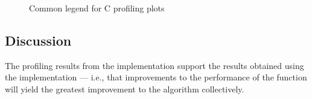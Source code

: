 \begin{figure}
    \centering
    
    \caption{Common legend for C profiling plots}
    \label{profiling:c:legend}
\end{figure}


\subsection{Discussion}
\label{profiling:c:discussion}
The profiling results from the  implementation support the results
obtained using the  implementation --- i.e., that improvements
to the performance of the  function will yield the
greatest improvement to the algorithm collectively.